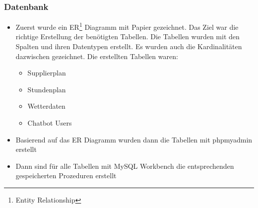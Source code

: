 \subsubsection{Datenbank}
\begin{itemize}
	\item Zuerst wurde ein ER\footnote{Entity Relationship} Diagramm mit Papier gezeichnet. Das Ziel war die richtige Erstellung der benötigten Tabellen. Die Tabellen wurden mit den Spalten und ihren Datentypen erstellt. Es wurden auch die Kardinalitäten dazwischen gezeichnet. Die erstellten Tabellen waren:
	
	\begin{itemize}
		\item Supplierplan
	\end{itemize}
    \begin{itemize}
    	\item Stundenplan
    \end{itemize}
    \begin{itemize}
    	\item Wetterdaten
    \end{itemize}
    \begin{itemize}
	\item Chatbot Users
    \end{itemize}	
\end{itemize}
\begin{itemize}
	\item Basierend auf das ER Diagramm wurden dann die Tabellen mit phpmyadmin erstellt
\end{itemize}
\begin{itemize}
	\item Dann sind für alle Tabellen mit MySQL Workbench die entsprechenden gespeicherten Prozeduren erstellt 
\end{itemize}	
